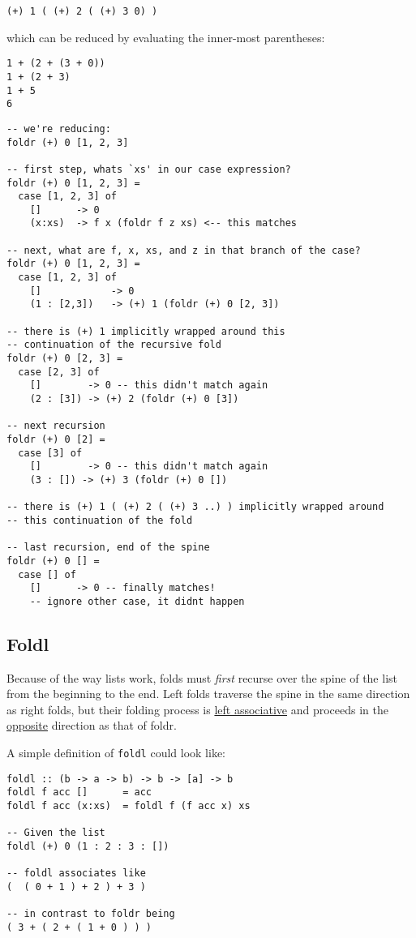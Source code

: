 \begin{verbatim}
(+) 1 ( (+) 2 ( (+) 3 0) )
\end{verbatim}

which can be reduced by evaluating the inner-most parentheses:
\begin{verbatim}
1 + (2 + (3 + 0))
1 + (2 + 3)
1 + 5
6
\end{verbatim}
 
\begin{lstlisting}[linewidth=15cm]
-- we're reducing:
foldr (+) 0 [1, 2, 3]

-- first step, whats `xs' in our case expression?
foldr (+) 0 [1, 2, 3] =
  case [1, 2, 3] of 
    []      -> 0
    (x:xs)  -> f x (foldr f z xs) <-- this matches

-- next, what are f, x, xs, and z in that branch of the case?
foldr (+) 0 [1, 2, 3] =
  case [1, 2, 3] of
    []            -> 0
    (1 : [2,3])   -> (+) 1 (foldr (+) 0 [2, 3])

-- there is (+) 1 implicitly wrapped around this
-- continuation of the recursive fold
foldr (+) 0 [2, 3] =
  case [2, 3] of
    []        -> 0 -- this didn't match again
    (2 : [3]) -> (+) 2 (foldr (+) 0 [3])

-- next recursion
foldr (+) 0 [2] =
  case [3] of
    []        -> 0 -- this didn't match again
    (3 : []) -> (+) 3 (foldr (+) 0 [])
    
-- there is (+) 1 ( (+) 2 ( (+) 3 ..) ) implicitly wrapped around
-- this continuation of the fold

-- last recursion, end of the spine
foldr (+) 0 [] =
  case [] of
    []      -> 0 -- finally matches!
    -- ignore other case, it didnt happen
\end{lstlisting}

\subsection{Foldl}
Because of the way lists work, folds must \emph{first} recurse over the spine of the list from the beginning to the end. Left folds traverse the spine in the same direction as right folds, but their folding process is \underline{left associative} and proceeds in the \underline{opposite} direction as that of foldr.

A simple definition of \texttt{foldl} could look like:
\begin{lstlisting}
foldl :: (b -> a -> b) -> b -> [a] -> b
foldl f acc []      = acc
foldl f acc (x:xs)  = foldl f (f acc x) xs

-- Given the list
foldl (+) 0 (1 : 2 : 3 : [])

-- foldl associates like
(  ( 0 + 1 ) + 2 ) + 3 )

-- in contrast to foldr being
( 3 + ( 2 + ( 1 + 0 ) ) )
\end{lstlisting}

